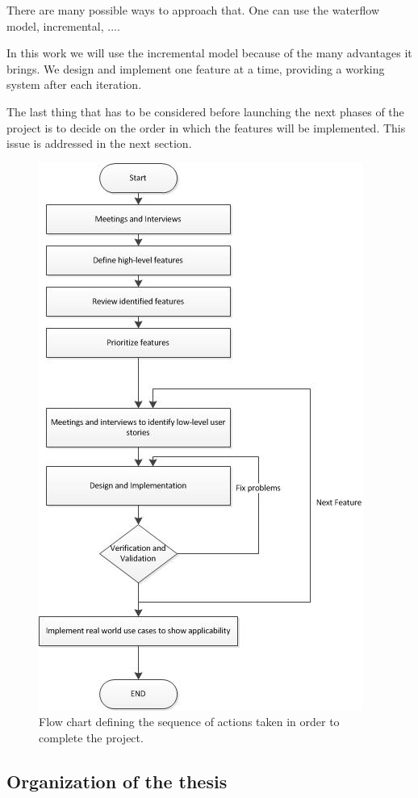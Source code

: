 There are many possible ways to approach that. One can use the waterflow model, incremental, ....

In this work we will use the incremental model because of the many advantages it brings. We design and implement one feature at a time, providing a working system after each iteration.

The last thing that has to be considered before launching the next phases of the project is to decide on the order in which the features will be implemented. This issue is addressed in the next section.

\begin{figure}[h!]
  \centering
      \includegraphics{introduction/WorkOrganization.jpg}
  \caption{Flow chart defining the sequence of actions taken in order to complete the project.}
\end{figure}

\subsection{Organization of the thesis}


